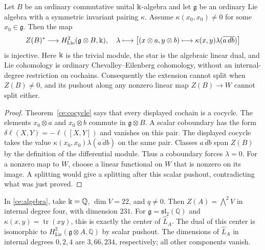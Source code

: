 \begin{proposition}
\label{ce:essential}
Let $B$ be an ordinary commutative unital $\Bbbk$-algebra and let
$\mathfrak g$ be an ordinary Lie algebra with a symmetric invariant
pairing $\kappa$.  Assume $\kappa(x_0,x_0)\ne0$ for some $x_0\in\mathfrak g$.  Then the map
\[
 Z(B)^*\longrightarrow H^2_{\mathrm{Lie}}(\mathfrak g\otimes B,\Bbbk),
 \quad
 \lambda\longmapsto
 \left[(x\otimes a,y\otimes b)\longmapsto
 \kappa(x,y)\lambda(\overline{a\,db})\right]
\]
is injective.  Here $\Bbbk$ is the trivial module, the star is the algebraic
linear dual, and Lie cohomology is ordinary Chevalley--Eilenberg
cohomology, without an internal-degree restriction on cochains.
Consequently the extension cannot split when $Z(B)\ne0$, and its pushout
along any nonzero linear map $Z(B)\to W$ cannot split either.
\end{proposition}

\begin{proof}
Theorem~\ref{ce:cocycle} says that every displayed cochain is a cocycle.
The elements $x_0\otimes a$ and $x_0\otimes b$ commute in
$\mathfrak g\otimes B$.  A scalar coboundary has the form
$\delta\ell(X,Y)=-\ell([X,Y])$ and vanishes on this pair.  The displayed
cocycle takes the value
$\kappa(x_0,x_0)\lambda(\overline{a\,db})$ on the same pair.
Classes $\overline{a\,db}$ span $Z(B)$ by the definition of the
differential module.  Thus a coboundary forces $\lambda=0$.
For a nonzero map to $W$, choose a linear functional on $W$ that is
nonzero on its image.  A splitting would give a splitting after this
scalar pushout, contradicting what was just proved.
\end{proof}

\begin{corollary}
\label{ce:k3}
In \eqref{ce:algebra}, take $\Bbbk=\mathbb Q$, $\dim V=22$, and $q\ne0$.
Then $Z(A)=\bigwedge^2V$ in internal degree four, with dimension $231$.
For $\mathfrak g=\mathfrak{sl}_2(\mathbb Q)$ and
$\kappa(x,y)=\operatorname{tr}(xy)$, this is exactly the center of
$\widehat L_A$.  The dual of this center is isomorphic to
$H^2_{\mathrm{Lie}}(\mathfrak g\otimes A,\mathbb Q)$ by scalar pushout.
The dimensions of $\widehat L_A$ in internal degrees $0,2,4$ are
$3,66,234$, respectively; all other components vanish.
\end{corollary}

